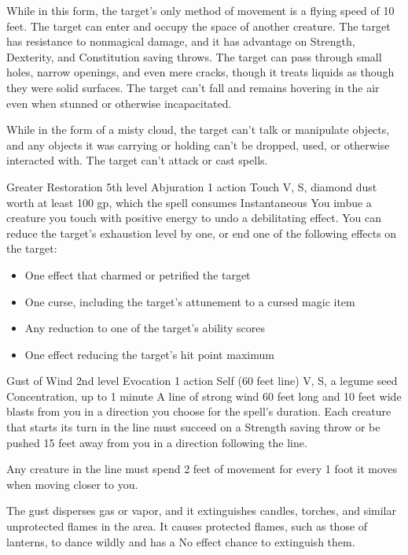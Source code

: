 \documentclass[10pt,a4paper,twoside,bg=print,twocolumn,openany,nodeprecatedcode]{dndbook}
\begin{document}
While in this form, the target's only method of movement is a flying speed of 10 feet. The target can enter and occupy the space of another creature. The target has resistance to nonmagical damage, and it has advantage on Strength, Dexterity, and Constitution saving throws. The target can pass through small holes, narrow openings, and even mere cracks, though it treats liquids as though they were solid surfaces. The target can't fall and remains hovering in the air even when stunned or otherwise incapacitated.

While in the form of a misty cloud, the target can't talk or manipulate objects, and any objects it was carrying or holding can't be dropped, used, or otherwise interacted with. The target can't attack or cast spells.



\DndSpellHeader%
{Greater Restoration}
{5th level Abjuration}
{1 action}
{Touch}
{V, S, diamond dust worth at least 100 gp, which the spell consumes}
{Instantaneous}
You imbue a creature you touch with positive energy to undo a debilitating effect. You can reduce the target's exhaustion level by one, or end one of the following effects on the target:


\begin{itemize}
\item One effect that charmed or petrified the target
\item One curse, including the target's attunement to a cursed magic item
\item Any reduction to one of the target's ability scores
\item One effect reducing the target's hit point maximum
\end{itemize}



\DndSpellHeader%
{Gust of Wind}
{2nd level Evocation}
{1 action}
{Self (60 feet line)}
{V, S, a legume seed}
{Concentration, up to 1 minute}
A line of strong wind 60 feet long and 10 feet wide blasts from you in a direction you choose for the spell's duration. Each creature that starts its turn in the line must succeed on a Strength saving throw or be pushed 15 feet away from you in a direction following the line.

Any creature in the line must spend 2 feet of movement for every 1 foot it moves when moving closer to you.

The gust disperses gas or vapor, and it extinguishes candles, torches, and similar unprotected flames in the area. It causes protected flames, such as those of lanterns, to dance wildly and has a No effect chance to extinguish them.
\end{document}
